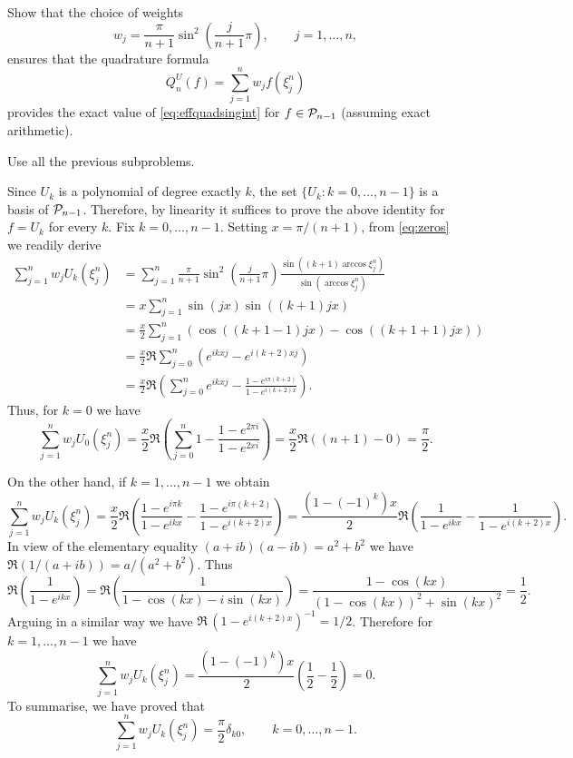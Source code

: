 \begin{problem}
\begin{subproblem}[4]
Show that the choice of weights
\begin{equation*}
w_j=\frac{\pi}{n+1}\sin^2\left(\frac{j}{n+1}\pi\right),\qquad j=1,\dots, n,
\end{equation*}
ensures that the quadrature formula
\begin{equation}\label{eq:quadrature_formula}
Q^U_n(f)=\sum_{j=1}^n w_j f(\xi^n_j)
\end{equation}
provides the exact value of  \eqref{eq:effquadsingint} for $f\in{\cal P}_{n-1}$ (assuming exact arithmetic).
 \begin{hint}
Use  all the previous subproblems.
\end{hint}
\begin{solution}
Since $U_{k}$ is a polynomial of degree exactly $k$, the set $\{U_k:k=0,\dots,n-1\}$ is a basis of ${\cal P}_{n-1}$. Therefore, by linearity it suffices to prove the above identity for $f=U_k$ for every $k$. Fix $k=0,\dots,n-1$. Setting $x=\pi/(n+1)$, from \eqref{eq:zeros} we readily derive
\[
\begin{split}
\sum_{j=1}^n w_j U_k(\xi^n_j) &=  \sum_{j=1}^n \frac{\pi}{n+1}\sin^2\left(\frac{j}{n+1}\pi\right) \frac{\sin((k+1)\arccos \xi^n_j)}{\sin(\arccos \xi^n_j)}\\
&=  x \sum_{j=1}^n \sin(jx) \sin((k+1)jx)\\
&=  \frac{x}{2} \sum_{j=1}^n\left(\cos((k+1-1)jx)-\cos((k+1+1)jx)\right)\\
&=  \frac{x}{2}\Re \sum_{j=0}^n \left( e^{i k x j}-e^{i(k+2) x j}\right)\\
&=  \frac{x}{2}\Re\left( \sum_{j=0}^n  e^{i k x j}-\frac{1-e^{i\pi(k+2)}}{1-e^{i (k+2) x }}\right).
\end{split}
\]
Thus, for $k=0$ we have
\[
\sum_{j=1}^n w_j U_0(\xi^n_j) = \frac{x}{2}\Re\left( \sum_{j=0}^n  1-\frac{1-e^{2\pi i}}{1-e^{ 2 x i }}\right)
= \frac{x}{2}\Re\left( (n+1)-0\right) = \frac{\pi}{2}.
\]

On the other hand, if $k=1,\dots,n-1$ we obtain
\[
\sum_{j=1}^n w_j U_k(\xi^n_j) =  \frac{x}{2}\Re\left( \frac{1-e^{i\pi k}}{1-e^{i k x}}-\frac{1-e^{i\pi(k+2)}}{1-e^{i (k+2) x }}\right) =  \frac{(1-(-1)^k)x}{2}\Re\left( \frac{1}{1-e^{i k x}}-\frac{1}{1-e^{i (k+2) x}}\right).
\]
In view of the elementary equality $(a+ib)(a-ib)=a^2+b^2$ we have $\Re(1/(a+ib)) = a/(a^2+b^2)$. Thus
\[
\Re\left( \frac{1}{1-e^{i k x}}\right) = \Re\left( \frac{1}{1-\cos(kx)-i\sin(kx)} \right)= \frac{1-\cos(kx)}{(1-\cos(kx))^2 + \sin(kx)^2}  = \frac{1}{2}.
\]
Arguing in a similar way we have $\Re\,(1-e^{i (k+2) x})^{-1}= 1/2$. Therefore for $k=1,\dots,n-1$ we have
\[
\sum_{j=1}^n w_j U_k(\xi^n_j) = \frac{(1-(-1)^k)x}{2}\left( \frac{1}{2} -\frac{1}{2} \right) = 0.
\]
To summarise, we have proved that
\[
 \sum_{j=1}^n w_j U_k(\xi^n_j) = \frac{\pi}{2}\delta_{k0},\qquad k=0,\dots,n-1.
  \]
  

\end{solution}
\end{subproblem}
\end{problem}
